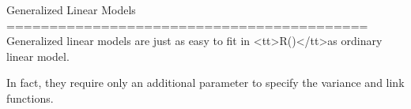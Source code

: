 Generalized Linear Models
==========================================
Generalized linear models are just as easy to fit in <tt>R()</tt>as ordinary linear model. 

In fact, they require only an additional parameter to specify the variance and link functions.
 
 



	